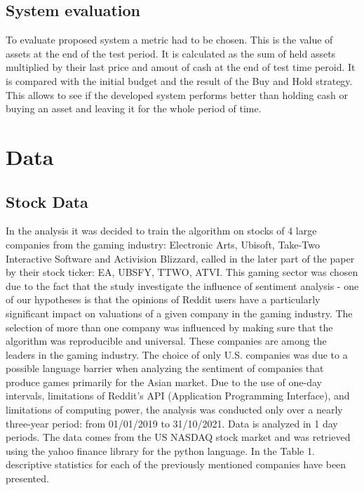 \documentclass[11pt]{article} %
\begin{document}
\subsection{System evaluation}
To evaluate proposed system a metric had to be chosen. This is the value of assets at the end of the test period. It is calculated as the sum of held assets multiplied by their last price and amout of cash at the end of test time peroid. It is compared with the initial budget and the result of the Buy and Hold strategy. This allows to see if the developed system performs better than holding cash or buying an asset and leaving it for the whole period of time. 

\section{Data}
\subsection{Stock Data}
In the analysis it was decided to train the algorithm on stocks of 4 large companies from the gaming industry: Electronic Arts, Ubisoft, Take-Two Interactive Software and Activision Blizzard, called in the later part of the paper by their stock ticker: EA, UBSFY, TTWO, ATVI. This gaming sector was chosen due to the fact that the study investigate the influence of sentiment analysis - one of our hypotheses is that the opinions of Reddit users have a particularly significant impact on valuations of a given company in the gaming industry.  The selection of more than one company was influenced by making sure that the algorithm was reproducible and universal. These companies are among the leaders in the gaming industry. The choice of only U.S. companies was due to a possible language barrier when analyzing the sentiment of companies that produce games primarily for the Asian market. Due to the use of one-day intervals, limitations of Reddit's API (Application Programming Interface), and limitations of computing power, the analysis was conducted only over a nearly three-year period: from 01/01/2019 to 31/10/2021. Data is analyzed in 1 day periods. The data comes from the US NASDAQ stock market and was retrieved using the yahoo finance library for the python language. In the Table 1. descriptive statistics for each of the previously mentioned companies have been presented. 
\end{document}
